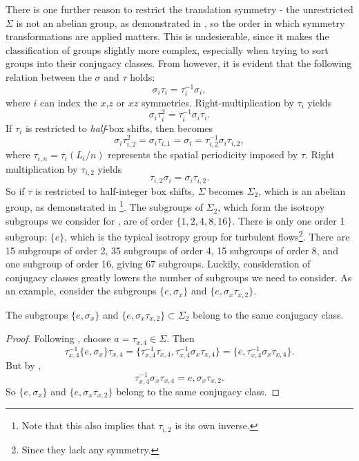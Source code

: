 There is one further reason to restrict the translation symmetry - the unrestricted $\Sigma$ is not an abelian group, as demonstrated in , so the order in which symmetry transformations are applied matters. This is undesierable, since it makes the classification of groups slightly more complex, especially when trying to sort groups into their conjugacy classes. From  however, it is evident that the following relation between the $\sigma$ and $\tau$ holds:
\begin{equation}
\sigma_{i}\tau_{i} = \tau_i^{-1}\sigma_i,
\end{equation}
where $i$ can index the $x$,$z$ or $xz$ symmetries. Right-multiplication by $\tau_i$ yields
\begin{equation}\label{eq:pscom}
\sigma_i\tau_i^2 = \tau_i^{-1}\sigma_i\tau_i.
\end{equation}
If $\tau_i$ is restricted to \emph{half}-box shifts, then  becomes
\begin{equation}
\sigma_i\tau_{i,2}^2 = \sigma_i\tau_{i,1} = \sigma_i = \tau_{i,2}^{-1}\sigma_{i}\tau_{i,2},
\end{equation}
where $\tau_{i,n} = \tau_i(L_i/n)$ represents the spatial periodicity imposed by $\tau$. Right multiplication by $\tau_{i,2}$ yields
\begin{equation}
\tau_{i,2}\sigma_{i} = \sigma_{i}\tau_{i,2}.
\end{equation}
So if $\tau$ is restricted to half-integer box shifts, $\Sigma$ becomes $\Sigma_2$, which is an abelian group, as demonstrated in \footnote{Note that this also implies that $\tau_{i,2}$ is its own inverse.}. The subgroups of $\Sigma_2$, which form the isotropy subgroups we consider for \pCf, are of order $\{1,2,4,8,16\}$. There is only one order 1 subgroup: $\{ e \}$, which is the typical isotropy group for turbulent flows\footnote{Since they lack any symmetry.}. There are 15 subgroups of order 2, 35 subgroups of order 4, 15 subgroups of order 8, and one subgroup of order 16, giving 67 subgroups. Luckily, consideration of conjugacy classes greatly lowers the number of subgroups we need to consider. As an example, consider the subgroups $\{ e, \sigma_x\}$ and $\{e, \sigma_x\tau_{x,2}\}$.
\clearpage
\begin{theorem}
The subgroups $\{ e, \sigma_x\}$ and $\{e, \sigma_x\tau_{x,2}\} \subset \Sigma_2$ belong to the same conjugacy class.
\end{theorem}
\begin{proof}
Following , choose $a = \tau_{x,4} \in \Sigma$. Then
\begin{equation}
\tau_{x,4}^{-1}\{ e, \sigma_x\}\tau_{x,4} = \{ \tau_{x,4}^{-1}\tau_{x,4},\tau_{x,4}^{-1}\sigma_x\tau_{x,4}\} =\{e,\tau_{x,4}^{-1}\sigma_x\tau_{x,4}\} .
\end{equation}
But by ,
\begin{equation}
\tau_{x,4}^{-1}\sigma_x\tau_{x,4} = e, \sigma_x\tau_{x,2}.
\end{equation}
So $\{ e, \sigma_x\}$ and $\{e, \sigma_x\tau_{x,2}\}$ belong to the same conjugacy class.
\end{proof}

